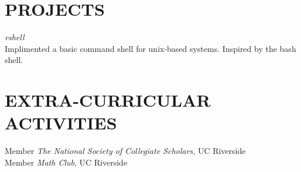 \documentclass[margin, 10pt]{res}
\begin{document}
\begin{resume}
\section{PROJECTS}

{\sl rshell} \\
Implimented a basic command shell for unix-based systems.
Inspired by the bash shell.



\section{EXTRA-CURRICULAR \\ ACTIVITIES} 

Member {\it The National Society of Collegiate Scholars}, UC Riverside \\
Member {\it Math Club}, UC Riverside

\end{resume}
\end{document}
